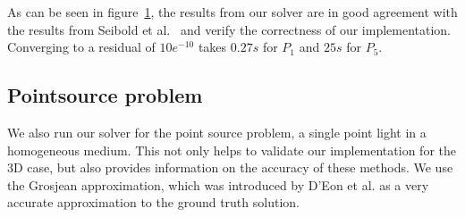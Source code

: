 \begin{figure}[h]
\begin{subfigure}{0.49\columnwidth}
\end{subfigure}%
\vspace{-0.2in}
\label{fig:vs_starmap}
\end{figure}

As can be seen in figure~\ref{fig:vs_starmap}, the results from our solver are in good agreement with the results from Seibold et al.~\cite{Seibold14} and verify the correctness of our implementation. Converging to a residual of $10e^{-10}$ takes $0.27s$ for $P_1$ and $25s$ for $P_5$.

\subsection{Pointsource problem}

We also run our solver for the point source problem, a single point light in a homogeneous medium. This not only helps to validate our implementation for the 3D case, but also provides information on the accuracy of these methods. We use the Grosjean approximation, which was introduced by D'Eon et al.\cite{dEon11} as a very accurate approximation to the ground truth solution.

